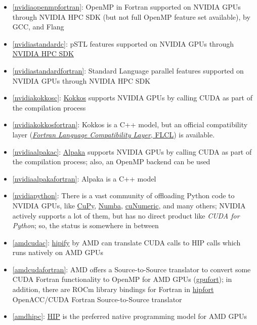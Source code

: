 \begin{frame}[allowframebreaks]
\begin{itemize}
        \item \ref{nvidiaopenmpfortran}: OpenMP in Fortran supported on NVIDIA GPUs through NVIDIA HPC SDK (but not full OpenMP feature set available), by GCC, and Flang
        \item \ref{nvidiastandardc}: pSTL features supported on NVIDIA GPUs through \href{https://docs.nvidia.com/hpc-sdk/compilers/c++-parallel-algorithms/}{NVIDIA HPC SDK}
        \item \ref{nvidiastandardfortran}: Standard Language parallel features supported on NVIDIA GPUs through NVIDIA HPC SDK
        \item \ref{nvidiakokkosc}: \href{https://github.com/kokkos/kokkos}{Kokkos} supports NVIDIA GPUs by calling CUDA as part of the compilation process
        \item \ref{nvidiakokkosfortran}: Kokkos is a C++ model, but an official compatibility layer (\href{https://github.com/kokkos/kokkos-fortran-interop}{\emph{Fortran Language Compatibility Layer}, FLCL}) is available.
        \item \ref{nvidiaalpakac}: \href{https://github.com/alpaka-group/alpaka}{Alpaka} supports NVIDIA GPUs by calling CUDA as part of the compilation process; also, an OpenMP backend can be used
        \item \ref{nvidiaalpakafortran}: Alpaka is a C++ model
        \item \ref{nvidiapython}: There is a vast community of offloading Python code to NVIDIA GPUs, like \href{https://cupy.dev/}{CuPy}, \href{https://numba.pydata.org/}{Numba}, \href{https://developer.nvidia.com/cunumeric}{cuNumeric}, and many others; NVIDIA actively supports a lot of them, but has no direct product like \emph{CUDA for Python}; so, the status is somewhere in between
        \item \ref{amdcudac}: \href{https://github.com/ROCm-Developer-Tools/HIPIFY}{hipify} by AMD can translate CUDA calls to HIP calls which runs natively on AMD GPUs
        \item \ref{amdcudafortran}: AMD offers a Source-to-Source translator to convert some CUDA Fortran functionality to OpenMP for AMD GPUs (\href{https://github.com/ROCmSoftwarePlatform/gpufort}{gpufort}); in addition, there are ROCm library bindings for Fortran in \href{https://github.com/ROCmSoftwarePlatform/hipfort}{hipfort} OpenACC/CUDA Fortran Source-to-Source translator
        \item \ref{amdhipc}: \href{https://github.com/ROCm-Developer-Tools/HIP}{HIP} is the preferred native programming model for AMD GPUs

\end{itemize}
\end{frame}
